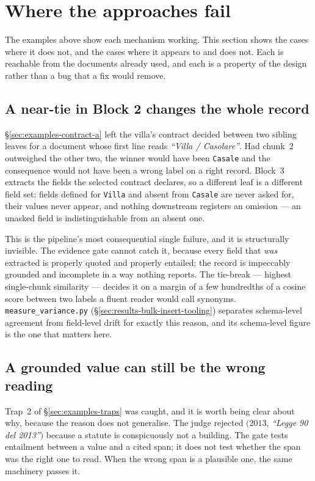 \section{Where the approaches fail}
\label{sec:examples-limits}

The examples above show each mechanism working. This section shows the cases where it does not, and the cases where it appears to and does not. Each is reachable from the documents already used, and each is a property of the design rather than a bug that a fix would remove.

\subsection{A near-tie in Block 2 changes the whole record}

\S\ref{sec:examples-contract-a} left the villa's contract decided between two sibling leaves for a document whose first line reads \emph{``Villa / Casolare''}. Had chunk~2 outweighed the other two, the winner would have been \texttt{Casale} and the consequence would not have been a wrong label on a right record. Block~3 extracts the fields the selected contract declares, so a different leaf is a different field set: fields defined for \texttt{Villa} and absent from \texttt{Casale} are never asked for, their values never appear, and nothing downstream registers an omission --- an unasked field is indistinguishable from an absent one.

This is the pipeline's most consequential single failure, and it is structurally invisible. The evidence gate cannot catch it, because every field that \emph{was} extracted is properly quoted and properly entailed; the record is impeccably grounded and incomplete in a way nothing reports. The tie-break --- highest single-chunk similarity --- decides it on a margin of a few hundredths of a cosine score between two labels a fluent reader would call synonyms. \texttt{measure\_variance.py} (\S\ref{sec:results-bulk-insert-tooling}) separates schema-level agreement from field-level drift for exactly this reason, and its schema-level figure is the one that matters here.

\subsection{A grounded value can still be the wrong reading}

Trap~2 of \S\ref{sec:examples-traps} was caught, and it is worth being clear about why, because the reason does not generalise. The judge rejected $(2013$, \emph{``Legge 90 del 2013''}$)$ because a statute is conspicuously not a building. The gate tests entailment between a value and a cited span; it does not test whether the span was the right one to read. When the wrong span is a plausible one, the same machinery passes it.

